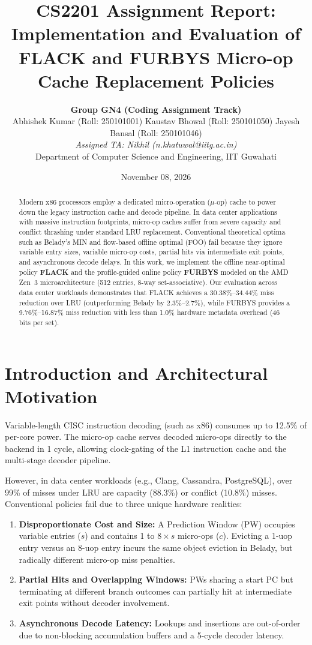 \documentclass[10pt,twocolumn]{article}
\title{\textbf{CS2201 Assignment Report: Implementation and Evaluation of FLACK and FURBYS Micro-op Cache Replacement Policies}}
\author{
    \textbf{Group GN4 (Coding Assignment Track)} \\
    Abhishek Kumar (Roll: 250101001) \quad
    Kaustav Bhowal (Roll: 250101050) \quad
    Jayesh Bansal (Roll: 250101046) \\
    \textit{Assigned TA: Nikhil (n.khatuwal@iitg.ac.in)} \\
    Department of Computer Science and Engineering, IIT Guwahati
}
\date{November 08, 2026}
\begin{document}
\maketitle

\begin{abstract}
Modern x86 processors employ a dedicated micro-operation ($\mu$-op) cache to power down the legacy instruction cache and decode pipeline. In data center applications with massive instruction footprints, micro-op caches suffer from severe capacity and conflict thrashing under standard LRU replacement. Conventional theoretical optima such as Belady's MIN and flow-based offline optimal (FOO) fail because they ignore variable entry sizes, variable micro-op costs, partial hits via intermediate exit points, and asynchronous decode delays. In this work, we implement the offline near-optimal policy \textbf{FLACK} and the profile-guided online policy \textbf{FURBYS} modeled on the AMD Zen~3 microarchitecture (512 entries, 8-way set-associative). Our evaluation across data center workloads demonstrates that FLACK achieves a 30.38\%--34.44\% miss reduction over LRU (outperforming Belady by 2.3\%--2.7\%), while FURBYS provides a 9.76\%--16.87\% miss reduction with less than 1.0\% hardware metadata overhead (46 bits per set).
\end{abstract}

\section{Introduction and Architectural Motivation}
Variable-length CISC instruction decoding (such as x86) consumes up to 12.5\% of per-core power. The micro-op cache serves decoded micro-ops directly to the backend in 1 cycle, allowing clock-gating of the L1 instruction cache and the multi-stage decoder pipeline. 

However, in data center workloads (e.g., Clang, Cassandra, PostgreSQL), over 99\% of misses under LRU are capacity (88.3\%) or conflict (10.8\%) misses. Conventional policies fail due to three unique hardware realities:
\begin{enumerate}
    \item \textbf{Disproportionate Cost and Size:} A Prediction Window (PW) occupies variable entries ($s$) and contains 1 to $8\times s$ micro-ops ($c$). Evicting a 1-uop entry versus an 8-uop entry incurs the same object eviction in Belady, but radically different micro-op miss penalties.
    \item \textbf{Partial Hits and Overlapping Windows:} PWs sharing a start PC but terminating at different branch outcomes can partially hit at intermediate exit points without decoder involvement.
    \item \textbf{Asynchronous Decode Latency:} Lookups and insertions are out-of-order due to non-blocking accumulation buffers and a 5-cycle decoder latency.
\end{enumerate}
\end{document}

